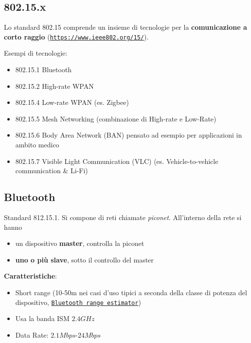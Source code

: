 \subsection{802.15.x}

Lo standard 802.15 comprende un insieme di tecnologie per la \textbf{comunicazione a corto raggio} (\texttt{\url{https://www.ieee802.org/15/}}).

Esempi di tecnologie: 
\begin{itemize}
	\item 802.15.1 Bluetooth

	\item 802.15.2 High-rate WPAN

	\item 802.15.4 Low-rate WPAN (es. Zigbee)

	\item 802.15.5 Mesh Networking (combinazione di High-rate e Low-Rate)

	\item 802.15.6 Body Area Network (BAN) pensato ad esempio per applicazioni in ambito medico

	\item 802.15.7 Visible Light Communication (VLC) (es. Vehicle-to-vehicle communication \& Li-Fi)
\end{itemize}

\subsection{Bluetooth}
Standard 812.15.1. Si compone di reti chiamate \textit{piconet}. All'interno della rete si hanno 
\begin{itemize}
    \item un dispositivo \textbf{master}, controlla la piconet
    
    \item \textbf{uno o più slave}, sotto il controllo del master
\end{itemize}

\textbf{Caratteristiche}: 
\begin{itemize}
	\item Short range (10-50m nei casi d'uso tipici a seconda della classe di potenza del dispositivo, \texttt{\href{https://www.bluetooth.com/learn-about-bluetooth/key-attributes/range/\#estimator}{Bluetooth range estimator}})
	
    \item Usa la banda ISM $2.4GHz$
	
    \item Data Rate: $2.1 Mbps$-$24Mbps$
\end{itemize}

